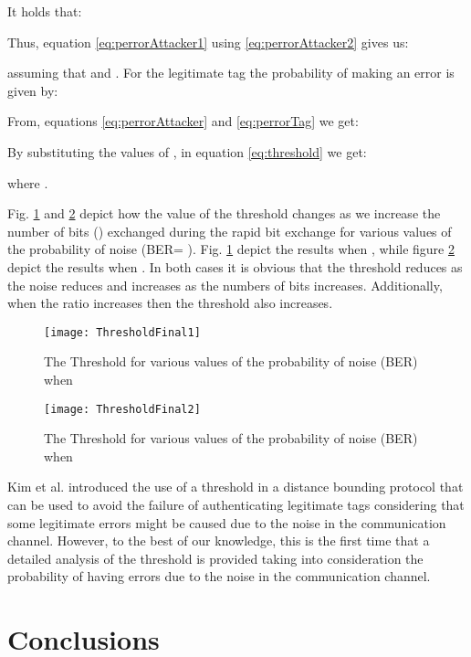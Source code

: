\documentclass{article}
\begin{document}
It holds that:

Thus, equation \eqref{eq:perrorAttacker1} using
\eqref{eq:perrorAttacker2} gives us:

assuming that  and .
For the legitimate tag  the probability of making an error 
is given by:

From, equations \eqref{eq:perrorAttacker} and \eqref{eq:perrorTag} we get:

By substituting the values of ,  in  equation \eqref{eq:threshold} we get:

where .

Fig. \ref{fig::figu1} and \ref{fig::figu2} depict how the value of the threshold  changes as we increase the number of bits () exchanged during the rapid bit exchange for various values of the probability of noise  (BER= ). Fig. \ref{fig::figu1} depict the results when , while figure \ref{fig::figu2} depict the results when . In both cases it is obvious that the threshold  reduces as the noise  reduces and increases as the numbers of bits  increases. Additionally, when the ratio  increases then the threshold  also increases.

\begin{figure}
\centering
\texttt{[image: ThresholdFinal1]}
  \caption{The Threshold   for various values of the probability of noise  (BER) when  }\label{fig::figu1}
\end{figure}

\begin{figure}
\centering
\texttt{[image: ThresholdFinal2]}
  \caption{The Threshold   for various values of the probability of noise  (BER) when  }\label{fig::figu2}
\end{figure}



Kim et al. \cite{KimAKSP-2008-icisc} introduced the use of a threshold  in a distance
bounding protocol that can be used to avoid the failure of
authenticating legitimate tags considering that some legitimate errors
might be caused due to the noise in the communication channel.
However, to the best of our knowledge, this is the first time that a
detailed analysis of the threshold  is provided taking into
consideration the probability of having errors due to the noise in the
communication channel.

\section{Conclusions}
\end{document}
